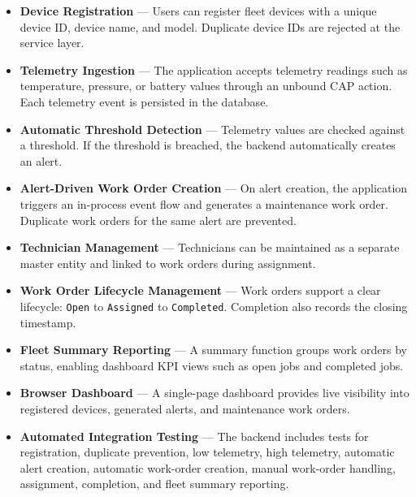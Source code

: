\documentclass[a4paper,12pt]{article}
\begin{document}
\begin{itemize}[leftmargin=1.5em, itemsep=4pt]
  \item \textbf{Device Registration} --- Users can register fleet devices with a unique device ID, device name, and model. Duplicate device IDs are rejected at the service layer.

  \item \textbf{Telemetry Ingestion} --- The application accepts telemetry readings such as temperature, pressure, or battery values through an unbound CAP action. Each telemetry event is persisted in the database.

  \item \textbf{Automatic Threshold Detection} --- Telemetry values are checked against a threshold. If the threshold is breached, the backend automatically creates an alert.

  \item \textbf{Alert-Driven Work Order Creation} --- On alert creation, the application triggers an in-process event flow and generates a maintenance work order. Duplicate work orders for the same alert are prevented.

  \item \textbf{Technician Management} --- Technicians can be maintained as a separate master entity and linked to work orders during assignment.

  \item \textbf{Work Order Lifecycle Management} --- Work orders support a clear lifecycle: \texttt{Open} to \texttt{Assigned} to \texttt{Completed}. Completion also records the closing timestamp.

  \item \textbf{Fleet Summary Reporting} --- A summary function groups work orders by status, enabling dashboard KPI views such as open jobs and completed jobs.

  \item \textbf{Browser Dashboard} --- A single-page dashboard provides live visibility into registered devices, generated alerts, and maintenance work orders.

  \item \textbf{Automated Integration Testing} --- The backend includes tests for registration, duplicate prevention, low telemetry, high telemetry, automatic alert creation, automatic work-order creation, manual work-order handling, assignment, completion, and fleet summary reporting.
\end{itemize}
\end{document}
